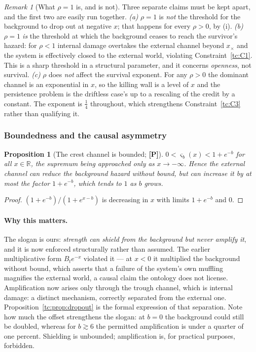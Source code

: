 \documentclass[11pt]{article}
\numberwithin{equation}{section}
\theoremstyle{plain}
\newtheorem{proposition}[theorem]{Proposition}
\theoremstyle{definition}
\theoremstyle{remark}
\newtheorem{remark}[theorem]{Remark}
\newcommand{\R}{\mathbb{R}}
\begin{document}
\begin{remark}[What $\rho=1$ is, and is not]\label{tc:rem:rhorole}
Three separate claims must be kept apart, and the first two are easily
run together.
\emph{(a)} $\rho=1$ is \emph{not} the threshold for the background to
drop out at negative $x$; that happens for every $\rho>0$, by
(i).
\emph{(b)} $\rho=1$ \emph{is} the threshold at which the background
ceases to reach the survivor's hazard: for $\rho<1$ internal damage
overtakes the external channel beyond $x_{\times}$ and the system is
effectively closed to the external world, violating
Constraint~\ref{tc:C1}. This is a sharp threshold in a structural
parameter, and it concerns \emph{openness}, not survival.
\emph{(c)} $\rho$ does \emph{not} affect the survival exponent. For any
$\rho>0$ the dominant channel is an exponential in $x$, so the killing
wall is a level of $x$ and the persistence problem is the driftless case's up
to a rescaling of the credit by a constant. The exponent is $\tfrac14$
throughout, which strengthens Constraint~\ref{tc:C3} rather than
qualifying it.
\end{remark}

\subsubsection{Boundedness and the causal asymmetry}
\label{tc:subsub:asymmetry}

\begin{proposition}[The crest channel is bounded; \textbf{[P]}]
\label{tc:prop:bounded}
$0<\varsigma_b(x)<1+e^{-b}$ for all $x\in\R$, the supremum being
approached only as $x\to-\infty$. Hence the external channel can
\emph{reduce} the background hazard without bound, but can
\emph{increase} it by at most the factor $1+e^{-b}$, which tends to $1$
as $b$ grows.
\end{proposition}

\begin{proof}
$(1+e^{-b})/(1+e^{x-b})$ is decreasing in $x$ with limits $1+e^{-b}$ and
$0$.
\end{proof}

\paragraph{Why this matters.}\label{tc:rem:asymmetry}
The slogan is ours: \emph{strength can shield from the
background but never amplify it}, and it is now enforced structurally
rather than assumed. The earlier multiplicative form $B_te^{-x}$
violated it --- at $x<0$ it multiplied the background without bound,
which asserts that a failure of the system's own muffling magnifies the
external world, a causal claim the ontology does not license.
Amplification now arises only through the trough channel, which is
internal damage: a distinct mechanism, correctly separated from the
external one. Proposition~\ref{tc:prop:dropout} is the formal expression
of that separation. Note how much the offset strengthens the slogan: at
$b=0$ the background could still be doubled, whereas for $b\gtrsim6$ the
permitted amplification is under a quarter of one percent. Shielding is
unbounded; amplification is, for practical purposes, forbidden.
\end{document}

